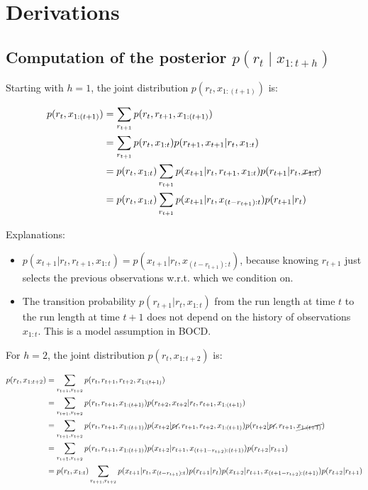 \documentclass{article}
\begin{document}
\section*{Derivations}

\subsection*{Computation of the posterior $p\left(r_{t} \mid x_{1:t+h}\right)$}

Starting with $h=1$, the joint distribution $p(r_{t},x_{1:(t+1)})$ is:

\begin{align}
p(r_{t},x_{1:(t+1)}) & =\sum_{r_{t+1}}p(r_{t},r_{t+1},x_{1:(t+1)})\\
 & =\sum_{r_{t+1}}p(r_{t},x_{1:t})p(r_{t+1},x_{t+1}\vert r_{t},x_{1:t})\\
 & =p(r_{t},x_{1:t})\sum_{r_{t+1}}p(x_{t+1}\vert r_{t},r_{t+1},x_{1:t})p(r_{t+1}\vert r_{t},\cancel{x_{1:t}})\\
 & =p(r_{t},x_{1:t})\sum_{r_{t+1}}p(x_{t+1}\vert r_{t},x_{(t-r_{t+1}):t})p(r_{t+1}\vert r_{t})
\end{align}

Explanations:
\begin{itemize}
    \item $p(x_{t+1}\vert r_{t},r_{t+1},x_{1:t})=p(x_{t+1}\vert r_{t},x_{(t-r_{t+1}):t})$, because knowing $r_{t+1}$ just selects the previous observations w.r.t. which we condition on.
    \item The transition probability $p(r_{t+1}\vert r_{t},x_{1:t})$ from the run length at time $t$ to the run length at time $t+1$ does not depend on the history of observations $x_{1:t}$. This is a model assumption in BOCD.
\end{itemize}

For $h=2$, the joint distribution $p(r_{t},x_{1:t+2})$ is:

\begin{align}
p(r_{t},x_{1:t+2}) & =\sum_{r_{t+1},r_{t+2}}p(r_{t},r_{t+1},r_{t+2},x_{1:(t+1)})\\
 & =\sum_{r_{t+1},r_{t+2}}p(r_{t},r_{t+1},x_{1:(t+1)})p(r_{t+2},x_{t+2}\vert r_{t},r_{t+1},x_{1:(t+1)})\\
 & =\sum_{r_{t+1},r_{t+2}}p(r_{t},r_{t+1},x_{1:(t+1)})p(x_{t+2}\vert\cancel{r_{t}},r_{t+1},r_{t+2},x_{1:(t+1)})p(r_{t+2}\vert\cancel{r_{t}},r_{t+1},\cancel{x_{1:(t+1)}})\\
 & =\sum_{r_{t+1},r_{t+2}}p(r_{t},r_{t+1},x_{1:(t+1)})p(x_{t+2}\vert r_{t+1},x_{\left(t+1-r_{t+2}\right):\left(t+1\right)})p(r_{t+2}\vert r_{t+1})\\
 & =p(r_{t},x_{1:t})\sum_{r_{t+1},r_{t+2}}p(x_{t+1}\vert r_{t},x_{(t-r_{t+1}):t})p(r_{t+1}\vert r_{t})p(x_{t+2}\vert r_{t+1},x_{\left(t+1-r_{t+2}\right):\left(t+1\right)})p(r_{t+2}\vert r_{t+1})
\end{align}
\end{document}
